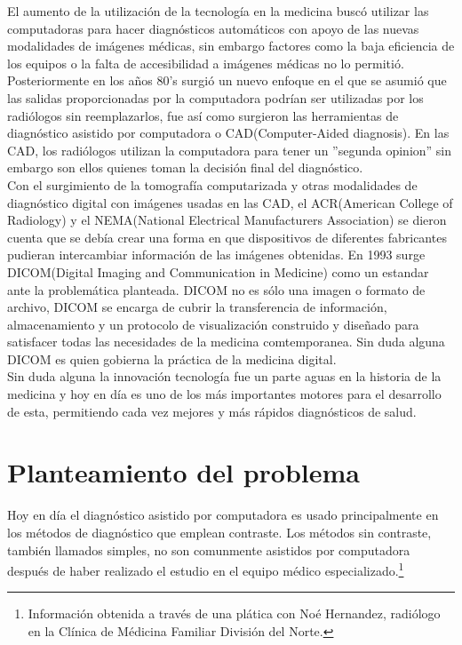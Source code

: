 \documentclass[12pt]{report}
\begin{document}
El aumento de la utilización de la tecnología en la medicina buscó utilizar las computadoras para hacer diagnósticos automáticos con apoyo de las nuevas modalidades de imágenes médicas, sin embargo factores como la baja eficiencia de los equipos o la falta de accesibilidad a imágenes médicas no lo permitió. Posteriormente en los años 80's surgió un nuevo enfoque en el que se asumió que las salidas proporcionadas por la computadora podrían ser utilizadas por los radiólogos sin reemplazarlos, fue así como surgieron las herramientas de diagnóstico asistido por computadora o CAD(Computer-Aided diagnosis). En las CAD, los radiólogos utilizan la computadora para tener un ''segunda opinion'' sin embargo son ellos quienes toman la decisión final del diagnóstico.\cite{cad}\\

Con el surgimiento de la tomografía computarizada y otras modalidades de diagnóstico digital con imágenes usadas en las CAD, el ACR(American College of Radiology) y el NEMA(National Electrical Manufacturers Association) se dieron cuenta que se debía crear una forma en que dispositivos de diferentes fabricantes pudieran intercambiar información de las imágenes obtenidas. En 1993 surge DICOM(Digital Imaging and Communication in Medicine) como un estandar ante la problemática planteada.\cite{DICOMNEMA} DICOM no es sólo una imagen o formato de archivo, DICOM se encarga de cubrir la transferencia de información, almacenamiento y un protocolo de visualización construido y diseñado para satisfacer todas las necesidades de la medicina comtemporanea. Sin duda alguna DICOM es quien gobierna la práctica de la medicina digital.\cite{dicl}\\

Sin duda alguna la innovación tecnología fue un parte aguas en la historia de la medicina y hoy en día es uno de los más importantes motores para el desarrollo de esta, permitiendo cada vez mejores y más rápidos diagnósticos de salud.

\section{Planteamiento del problema}
Hoy en día el diagnóstico asistido por computadora es usado principalmente en los métodos de diagnóstico que emplean contraste. Los métodos sin contraste, también llamados simples, no son comunmente asistidos por computadora después de haber realizado el estudio en el equipo médico especializado.\footnote{Información obtenida a través de una plática con Noé Hernandez, radiólogo en la Clínica de Médicina Familiar División del Norte.}\\
\end{document}

